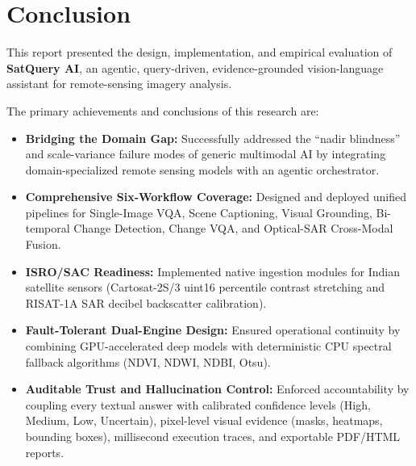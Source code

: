 \documentclass[12pt,a4paper]{report}
\begin{document}
\section{Conclusion}
This report presented the design, implementation, and empirical evaluation of \textbf{SatQuery AI}, an agentic, query-driven, evidence-grounded vision-language assistant for remote-sensing imagery analysis. 

The primary achievements and conclusions of this research are:
\begin{itemize}
    \item \textbf{Bridging the Domain Gap:} Successfully addressed the ``nadir blindness'' and scale-variance failure modes of generic multimodal AI by integrating domain-specialized remote sensing models with an agentic orchestrator.
    \item \textbf{Comprehensive Six-Workflow Coverage:} Designed and deployed unified pipelines for Single-Image VQA, Scene Captioning, Visual Grounding, Bi-temporal Change Detection, Change VQA, and Optical-SAR Cross-Modal Fusion.
    \item \textbf{ISRO/SAC Readiness:} Implemented native ingestion modules for Indian satellite sensors (Cartosat-2S/3 uint16 percentile contrast stretching and RISAT-1A SAR decibel backscatter calibration).
    \item \textbf{Fault-Tolerant Dual-Engine Design:} Ensured operational continuity by combining GPU-accelerated deep models with deterministic CPU spectral fallback algorithms (NDVI, NDWI, NDBI, Otsu).
    \item \textbf{Auditable Trust and Hallucination Control:} Enforced accountability by coupling every textual answer with calibrated confidence levels (High, Medium, Low, Uncertain), pixel-level visual evidence (masks, heatmaps, bounding boxes), millisecond execution traces, and exportable PDF/HTML reports.
\end{itemize}
\end{document}
